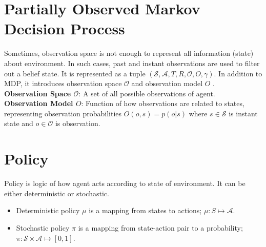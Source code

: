 \section{Partially Observed Markov Decision Process}
\label{sec:pomdp}
Sometimes, observation space is not enough to represent all information (state) about environment. In such cases, past and instant observations are used to filter out a belief state. It is represented as a tuple $(\mathcal{S},\mathcal{A},T,R,\mathcal{O},O,\gamma)$. In addition to MDP, it introduces observation space $\mathcal{O}$ and observation model $O$ \cite{francois-lavet_introduction_2018}. \\
\textbf{Observation Space $\mathcal{O}$}: A set of all possible observations of agent. \\
\textbf{Observation Model $O$}: Function of how observations are related to states, representing observation probabilities $O(o,s) = p(o|s)$ where $s \in \mathcal{S}$ is instant state and $o \in \mathcal{O}$ is observation. \\ 
\section{Policy}
Policy is logic of how agent acts according to state of environment. It can be either deterministic or stochastic. \\
\begin{itemize}
	\item Deterministic policy $\mu$ is a mapping from states to actions; $\mu \colon S \mapsto \mathcal{A}$.
	\item Stochastic policy $\pi$ is a mapping from state-action pair to a probability; $\pi \colon \mathcal{S} \times \mathcal{A} \mapsto [0,1]$.
\end{itemize}

